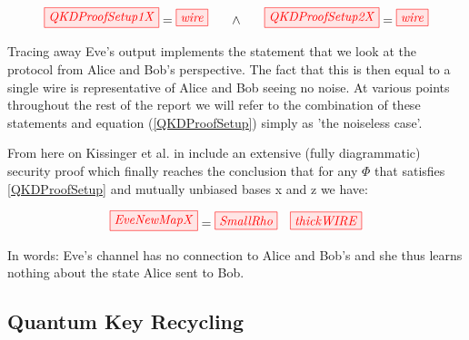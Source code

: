 \documentclass[]{article}
\begin{document}
\begin{equation}
	\label{QKDProofSetup}
	\tikzfig{QKDProofSetup1X} = \tikzfig{wire} ~~~~~ \land ~~~~~ \tikzfig{QKDProofSetup2X} = \tikzfig{wire}
\end{equation}

Tracing away Eve's output implements the statement that we look at the protocol from Alice and Bob's perspective. The fact that this is then equal to a single wire is representative of Alice and Bob seeing no noise. At various points throughout the rest of the report we will refer to the combination of these statements and equation (\ref{QKDProofSetup}) simply as 'the noiseless case'.

From here on Kissinger et al. in \cite{Kissinger2017} include an extensive (fully diagrammatic) security proof which finally reaches the conclusion that for any $\Phi$ that satisfies \ref{QKDProofSetup} and mutually unbiased bases x and z we have:

\begin{equation}
\tikzfig{EveNewMapX} = \tikzfig{SmallRho}  ~~~ \tikzfig{thickWIRE}
\end{equation}

In words: Eve's channel has no connection to Alice and Bob's and she thus learns nothing about the state Alice sent to Bob.


\subsection{Quantum Key Recycling}
\label{section:qkr}
\end{document}
